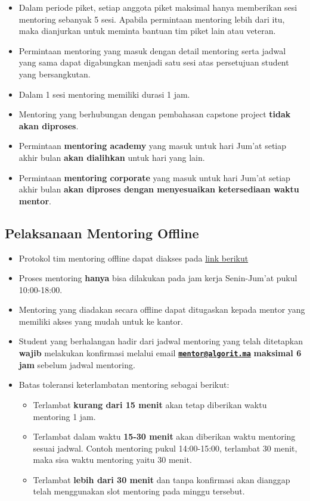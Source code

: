 \documentclass[
]{book}
\providecommand{\tightlist}{%
  \setlength{\itemsep}{0pt}\setlength{\parskip}{0pt}}
\begin{document}
\begin{itemize}
\tightlist
\item
  Dalam periode piket, setiap anggota piket maksimal hanya memberikan sesi mentoring sebanyak 5 sesi. Apabila permintaan mentoring lebih dari itu, maka dianjurkan untuk meminta bantuan tim piket lain atau veteran.
\item
  Permintaan mentoring yang masuk dengan detail mentoring serta jadwal yang sama dapat digabungkan menjadi satu sesi atas persetujuan student yang bersangkutan.
\item
  Dalam 1 sesi mentoring memiliki durasi 1 jam.
\item
  Mentoring yang berhubungan dengan pembahasan capstone project \textbf{tidak akan diproses}.
\item
  Permintaan \textbf{mentoring academy} yang masuk untuk hari Jum'at setiap akhir bulan \textbf{akan dialihkan} untuk hari yang lain.
\item
  Permintaan \textbf{mentoring corporate} yang masuk untuk hari Jum'at setiap akhir bulan \textbf{akan diproses dengan menyesuaikan ketersediaan waktu mentor}.
\end{itemize}

\hypertarget{pelaksanaan-mentoring-offline}{%
\subsection{Pelaksanaan Mentoring Offline}\label{pelaksanaan-mentoring-offline}}

\begin{itemize}
\item
  Protokol tim mentoring offline dapat diakses pada \href{https://docs.google.com/document/d/1L6lA0MJoyhfeYlzFBf-TuuJ8SGhZE4Yc49_kXDWkkLw/edit?usp=sharing}{link berikut}
\item
  Proses mentoring \textbf{hanya} bisa dilakukan pada jam kerja Senin-Jum'at pukul 10:00-18:00.
\item
  Mentoring yang diadakan secara offline dapat ditugaskan kepada mentor yang memiliki akses yang mudah untuk ke kantor.
\item
  Student yang berhalangan hadir dari jadwal mentoring yang telah ditetapkan \textbf{wajib} melakukan konfirmasi melalui email \textbf{\href{mailto:mentor@algorit.ma}{\nolinkurl{mentor@algorit.ma}}} \textbf{maksimal 6 jam} sebelum jadwal mentoring.
\item
  Batas toleransi keterlambatan mentoring sebagai berikut:

  \begin{itemize}
  \tightlist
  \item
    Terlambat \textbf{kurang dari 15 menit} akan tetap diberikan waktu mentoring 1 jam.
  \item
    Terlambat dalam waktu \textbf{15-30 menit} akan diberikan waktu mentoring sesuai jadwal. Contoh mentoring pukul 14:00-15:00, terlambat 30 menit, maka sisa waktu mentoring yaitu 30 menit.
  \item
    Terlambat \textbf{lebih dari 30 menit} dan tanpa konfirmasi akan dianggap telah menggunakan slot mentoring pada minggu tersebut.
  \end{itemize}
\end{itemize}
\end{document}
